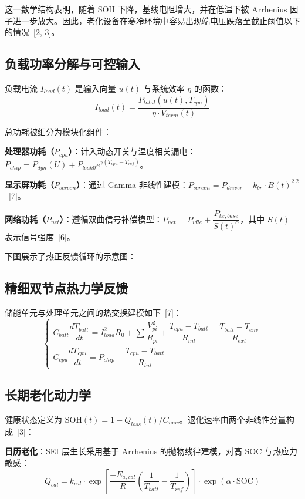 \documentclass[11pt,a4paper]{ctexart}
\begin{document}
这一数学结构表明，随着 SOH 下降，基线电阻增大，并在低温下被 Arrhenius 因子进一步放大。因此，老化设备在寒冷环境中容易出现端电压跌落至截止阈值以下的情况~[2, 3]。

\subsection{负载功率分解与可控输入}

负载电流 $I_{load}(t)$ 是输入向量 $u(t)$ 与系统效率 $\eta$ 的函数：
\begin{equation}
I_{load}(t)=\frac{P_{total}(u(t),T_{cpu})}{\eta\cdot V_{term}(t)}
\end{equation}

总功耗被细分为模块化组件：

\textbf{处理器功耗（$P_{cpu}$）}：计入动态开关与温度相关漏电：$P_{chip}=P_{dyn}(U)+P_{leak0}e^{\gamma(T_{cpu}-T_{ref})}$。

\textbf{显示屏功耗（$P_{screen}$）}：通过 Gamma 非线性建模：$P_{screen}=P_{driver}+k_{br}\cdot B(t)^{2.2}$~[7]。

\textbf{网络功耗（$P_{net}$）}：遵循双曲信号补偿模型：$P_{net}=P_{idle}+\dfrac{P_{tx,base}}{S(t)^{\alpha}}$，其中 $S(t)$ 表示信号强度~[6]。

下图展示了热正反馈循环的示意图：

\subsection{精细双节点热力学反馈}

储能单元与处理单元之间的热交换建模如下~[7]：
\begin{equation}
\begin{cases}
C_{batt}\dfrac{dT_{batt}}{dt}=I_{load}^{2}R_0+\sum\dfrac{V_{pi}^{2}}{R_{pi}}+\dfrac{T_{cpu}-T_{batt}}{R_{int}}-\dfrac{T_{batt}-T_{env}}{R_{ext}}\\[2ex]
C_{cpu}\dfrac{dT_{cpu}}{dt}=P_{chip}-\dfrac{T_{cpu}-T_{batt}}{R_{int}}
\end{cases}
\end{equation}

\subsection{长期老化动力学}

健康状态定义为 $\mathrm{SOH}(t)=1-Q_{loss}(t)/C_{new}$。退化速率由两个非线性分量构成~[3]：

\textbf{日历老化}：SEI 层生长采用基于 Arrhenius 的抛物线律建模，对高 SOC 与热应力敏感：
\begin{equation}
\dot{Q}_{cal}=k_{cal}\cdot\exp\!\left[\frac{-E_{a,cal}}{R}\left(\frac{1}{T_{batt}}-\frac{1}{T_{ref}}\right)\right]\cdot\exp(\alpha\cdot \mathrm{SOC})
\end{equation}
\end{document}
